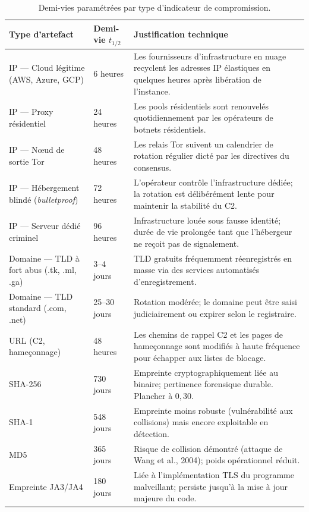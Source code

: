 \begin{table}[ht]
\centering
\caption{Demi-vies paramétrées par type d'indicateur de compromission.}
\label{tab:decay-half-lives}
\begin{tabular}{|l|l|p{7.5cm}|}
\hline
\textbf{Type d'artefact} & \textbf{Demi-vie $t_{1/2}$} & \textbf{Justification technique} \\
\hline
IP — Cloud légitime (AWS, Azure, GCP) & 6 heures & Les fournisseurs d'infrastructure en nuage recyclent les adresses IP élastiques en quelques heures après libération de l'instance. \\
\hline
IP — Proxy résidentiel & 24 heures & Les pools résidentiels sont renouvelés quotidiennement par les opérateurs de botnets résidentiels. \\
\hline
IP — N\oe ud de sortie Tor & 48 heures & Les relais Tor suivent un calendrier de rotation régulier dicté par les directives du consensus. \\
\hline
IP — Hébergement blindé (\textit{bulletproof}) & 72 heures & L'opérateur contrôle l'infrastructure dédiée; la rotation est délibérément lente pour maintenir la stabilité du C2. \\
\hline
IP — Serveur dédié criminel & 96 heures & Infrastructure louée sous fausse identité; durée de vie prolongée tant que l'hébergeur ne reçoit pas de signalement. \\
\hline
Domaine — TLD à fort abus (.tk, .ml, .ga) & 3--4 jours & TLD gratuits fréquemment réenregistrés en masse via des services automatisés d'enregistrement. \\
\hline
Domaine — TLD standard (.com, .net) & 25--30 jours & Rotation modérée; le domaine peut être saisi judiciairement ou expirer selon le registraire. \\
\hline
URL (C2, hameçonnage) & 48 heures & Les chemins de rappel C2 et les pages de hameçonnage sont modifiés à haute fréquence pour échapper aux listes de blocage. \\
\hline
SHA-256 & 730 jours & Empreinte cryptographiquement liée au binaire; pertinence forensique durable. Plancher à $0{,}30$. \\
\hline
SHA-1 & 548 jours & Empreinte moins robuste (vulnérabilité aux collisions) mais encore exploitable en détection. \\
\hline
MD5 & 365 jours & Risque de collision démontré (attaque de Wang et al., 2004); poids opérationnel réduit. \\
\hline
Empreinte JA3/JA4 & 180 jours & Liée à l'implémentation TLS du programme malveillant; persiste jusqu'à la mise à jour majeure du code. \\

\end{tabular}
\end{table}
